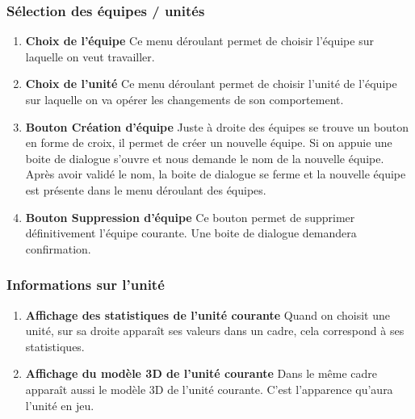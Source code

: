 \documentclass{report}
\begin{document}
\subsubsection{Sélection des équipes / unités}
\begin{enumerate}[label=\Alph*)]
\item\textbf{Choix de l'équipe} \newline
Ce menu déroulant permet de choisir l'équipe sur laquelle on veut travailler.
\item\textbf{Choix de l'unité} \newline
Ce menu déroulant permet de choisir l'unité de l'équipe sur laquelle on va opérer les changements de son comportement.
\item\textbf{Bouton Création d'équipe} \newline
Juste à droite des équipes se trouve un bouton en forme de croix, il permet de créer un nouvelle équipe. Si on appuie une boite de dialogue s'ouvre et nous demande le nom de la nouvelle équipe. Après avoir validé le nom, la boite de dialogue se ferme et la nouvelle équipe est présente dans le menu déroulant des équipes.
\item\textbf{Bouton Suppression d'équipe} \newline
Ce bouton permet de supprimer définitivement l'équipe courante. Une boite de dialogue demandera confirmation.
\end{enumerate}


\subsubsection{Informations sur l'unité}
\begin{enumerate}[label=\Alph*)]
\item\textbf{Affichage des statistiques de l'unité courante} \newline
Quand on choisit une unité, sur sa droite apparaît ses valeurs dans un cadre, cela correspond à ses statistiques.
\item\textbf{Affichage du modèle 3D de l'unité courante} \newline
Dans le même cadre apparaît aussi le modèle 3D de l'unité courante. C'est l'apparence qu'aura l'unité en jeu.
\end{enumerate}


\end{document}
